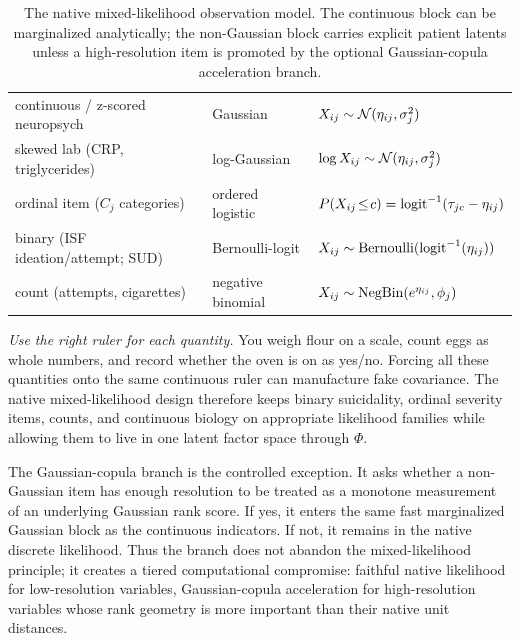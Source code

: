 \begin{table}[h]\centering\small\sffamily
\caption{The native mixed-likelihood observation model. The continuous block can be marginalized analytically;
the non-Gaussian block carries explicit patient latents unless a high-resolution item is promoted by the optional
Gaussian-copula acceleration branch.}
\label{tab:likelihoods}
\begin{tabular}{L{5.0cm} L{4.0cm} L{5.0cm}}
\toprule
{} &  & \\
\midrule
{} continuous / z-scored neuropsych & Gaussian & $X_{ij}\sim\mathcal{N}(\eta_{ij},\sigma_j^2)$\\
skewed lab (CRP, triglycerides) & log-Gaussian & $\log X_{ij}\sim\mathcal{N}(\eta_{ij},\sigma_j^2)$\\
 ordinal item ($C_j$ categories) & ordered logistic & $P(X_{ij}\!\le\! c)=\operatorname{logit}^{-1}(\tau_{jc}-\eta_{ij})$\\
binary (ISF ideation/attempt; SUD) & Bernoulli-logit & $X_{ij}\sim\mathrm{Bernoulli}(\operatorname{logit}^{-1}(\eta_{ij}))$\\
 count (attempts, cigarettes) & negative binomial & $X_{ij}\sim\mathrm{NegBin}(e^{\eta_{ij}},\phi_j)$\\
\bottomrule
\end{tabular}
\end{table}

\emph{Use the right ruler for each quantity.} You weigh flour on a scale, count eggs as whole numbers, and record
whether the oven is on as yes/no. Forcing all these quantities onto the same continuous ruler can manufacture
fake covariance. The native mixed-likelihood design therefore keeps binary suicidality, ordinal severity items,
counts, and continuous biology on appropriate likelihood families while allowing them to live in one latent
factor space through $\Phi$.

The Gaussian-copula branch is the controlled exception. It asks whether a non-Gaussian item has enough resolution
to be treated as a monotone measurement of an underlying Gaussian rank score. If yes, it enters the same fast
marginalized Gaussian block as the continuous indicators. If not, it remains in the native discrete likelihood.
Thus the branch does not abandon the mixed-likelihood principle; it creates a tiered computational compromise:
faithful native likelihood for low-resolution variables, Gaussian-copula acceleration for high-resolution
variables whose rank geometry is more important than their native unit distances.

